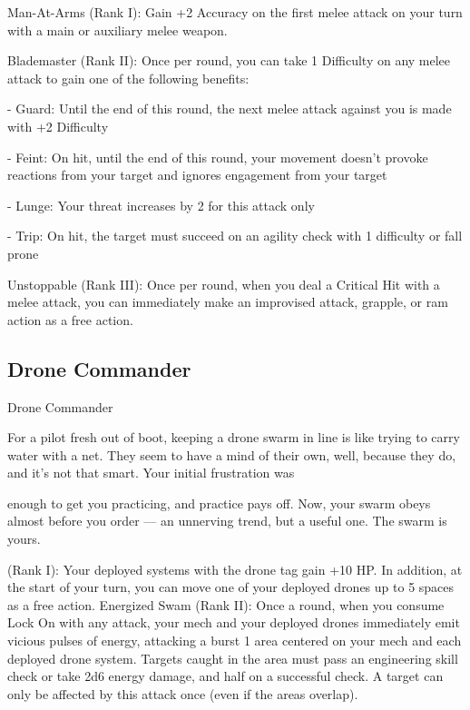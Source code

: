 Man-At-Arms (Rank I): Gain +2 Accuracy on the first melee attack on your turn with a main or  
auxiliary melee weapon.
 
Blademaster (Rank II): Once per round, you can take 1 Difficulty on any melee attack to gain  
one of the following benefits:
 
     -   Guard: Until the end of this round, the next melee attack against you is made with +2  
         Difficulty
 
     -   Feint: On hit, until the end of this round, your movement doesn't provoke reactions from  
         your target and ignores engagement from your target
 
     -   Lunge: Your threat increases by 2 for this attack only
 
     -   Trip: On hit, the target must succeed on an agility check with 1 difficulty or fall prone
 
Unstoppable (Rank III): Once per round, when you deal a Critical Hit with a melee attack, you  
can immediately make an improvised attack, grapple, or ram action as a free action.
 

                                                                                                                 
\subsection{Drone Commander}


                                           Drone Commander  

For a pilot fresh out of boot, keeping a drone swarm in line is like trying to carry water with a net. They  
seem to have a mind of their own, well, because they do, and it’s not that smart. Your initial frustration was  

enough to get you practicing, and practice pays off. Now, your swarm obeys almost before you order — an  
unnerving trend, but a useful one. The swarm is yours.   

(Rank I): Your deployed systems with the drone tag gain +10 HP. In addition, at the start of your  
turn, you can move one of your deployed drones up to 5 spaces as a free action.  
Energized Swam (Rank II): Once a round, when you consume Lock On with any attack, your  
mech and your deployed drones immediately emit vicious pulses of energy, attacking a burst 1  
area centered on your mech and each deployed drone system. Targets caught in the area must  
pass an engineering skill check or take 2d6 energy damage, and half on a successful check. A  
target can only be affected by this attack once (even if the areas overlap).
 

